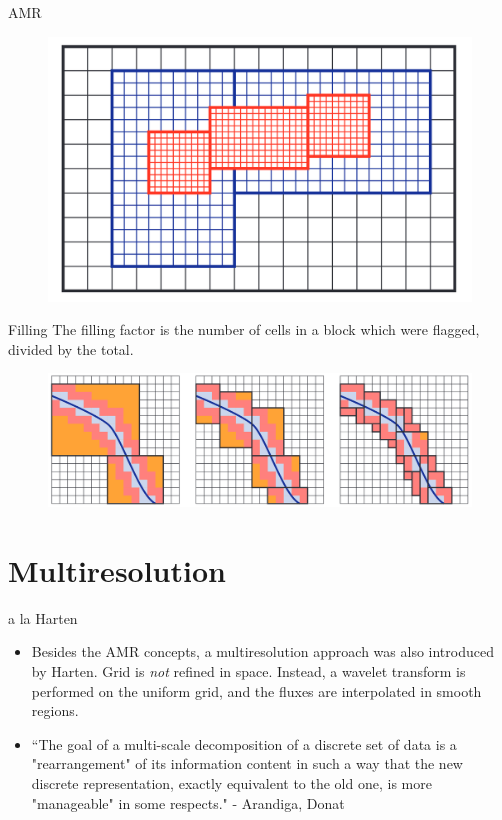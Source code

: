 \documentclass{beamer}
\begin{document}
\begin{frame}{AMR}
    \begin{figure}
        \center
        \includegraphics[scale=0.4]{amr3.png}
    \end{figure}
\end{frame}

\begin{frame}{Filling}
    The filling factor is the number of cells in a block which were flagged, divided by the total.
    \begin{figure}
        \center
        \includegraphics[scale=0.3]{filling.png}
    \end{figure}
\end{frame}

\section{Multiresolution}

\begin{frame}{a la Harten}
    \begin{itemize}
        \item<1-> Besides the AMR concepts, a multiresolution approach was also introduced by
            Harten. Grid is \textit{not} refined in space. Instead, a wavelet
            transform is performed on the uniform grid, and the fluxes are 
            interpolated in smooth regions. \\
        \item<2->``The goal of a multi-scale decomposition of a discrete set of
            data is a "rearrangement" of its information content in such a way
            that the new discrete representation, exactly equivalent to the old
            one, is more "manageable" in some respects." - Arandiga, Donat
    \end{itemize}
\end{frame}
\end{document}
